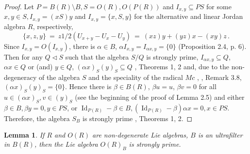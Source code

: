 \documentclass[a4paper,11pt]{article}
\newtheorem{lemma}[defi]{Lemma}
\DeclareMathOperator{\Id}{Id}
\begin{document}
\begin{proof}
Let ${P=B(R)\setminus B, S=O(R), O(P(R))}$ and ${I_{x, y}\subseteq P S}$ 
for some ${x, y\in S, I_{x, y}=(x S) y}$ and ${I_{x, y}=\{x, S, y\}}$ 
for the alternative and linear Jordan algebra $R$, respectively, 
\[
\{x, z ,y\}\ =\ z 1/2 (U_{x+y}-U_x-U_y)\ =\ (x z) y+(y z) x-(x y) z\,. 
\]
Since ${I_{x, y}=O(I_{x, y})}$, there is ${\alpha\in B}$, ${\alpha I_{x, y}=
I_{\alpha x, y}=\{0\}}$ (Proposition 2.4, p. 6). Then for any ${Q\lhd S}$ 
such that the algebra $S/Q$ is strongly prime, ${I_{\alpha x, y}\subseteq Q}$, 
${\alpha x\in Q}$ or (and) ${y\in Q}$, ${(\alpha x)_S (y)_S\subseteq Q}$ 
\cite{BMS}, Theorems 1, 2 and, due to the non-degeneracy of the algebra $S$ 
and the speciality of the radical $Mc$ \cite{ZelM}, \cite{Gol10}, 
Remark 3.8, ${(\alpha x)_S (y)_S=\{0\}}$. 
Hence there is ${\beta\in B(R)}$, ${\beta u=u}$, ${\beta v=0}$ for all 
${u\in (\alpha x)_S, v\in (y)_S}$ (see the beginning of the proof of 
Lemma 2.5) and either ${\beta\in B, \beta y=0, y\in P S}$, or 
${\Id_{P(R)}-\beta\in B, (\Id_{P(R)}-\beta) \alpha x=0, x\in P S}$. 
Therefore, the algebra $S_B$ is strongly prime \cite{BMS}, Theorems 1, 2.
\end{proof}
    
\begin{lemma}
If $R$ and $O(R)$ are non-degenerate Lie algebras, $B$ is an ultrafilter in 
$B(R)$, then the Lie algebra $O(R)_B$ is strongly prime.
\end{lemma}
\end{document}
